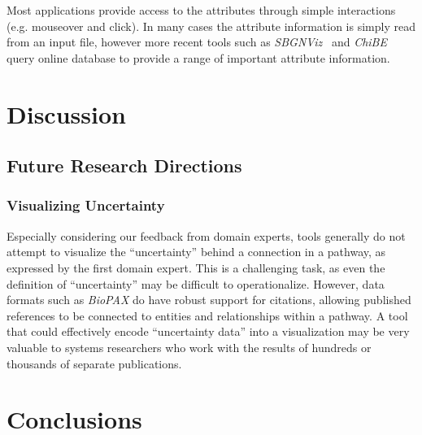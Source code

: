 Most applications provide access to the attributes through simple interactions (e.g. mouseover and click).
In many cases the attribute information is simply read from an input file, however more recent tools such as \textit{SBGNViz}~\cite{SBGNViz2015} and \textit{ChiBE}\cite{Babur2010chibe} query online database to provide a range of important attribute information.

\section{Discussion}

\subsection{Future Research Directions}

\subsubsection{Visualizing Uncertainty}

Especially considering our feedback from domain experts, tools generally do not attempt to visualize the ``uncertainty'' behind a connection in a pathway, as expressed by the first domain expert. This is a challenging task, as even the definition of ``uncertainty'' may be difficult to operationalize. However, data formats such as \emph{BioPAX} do have robust support for citations, allowing published references to be connected to entities and relationships within a pathway. A tool that could effectively encode ``uncertainty data'' into a visualization may be very valuable to systems researchers who work with the results of hundreds or thousands of separate publications.

\section{Conclusions}








